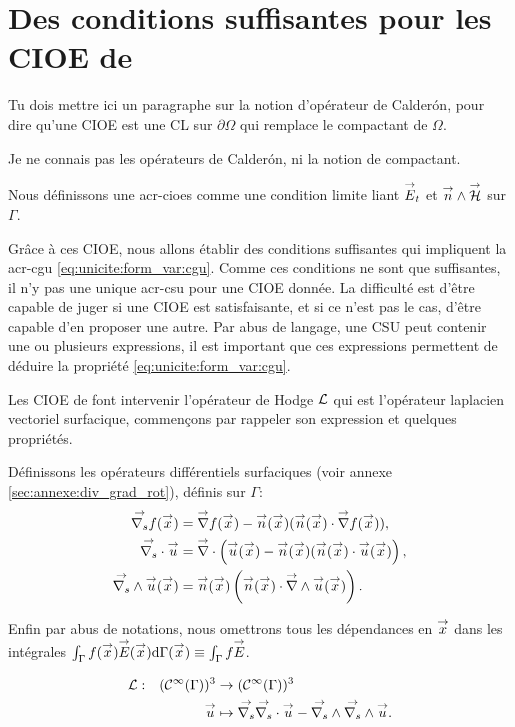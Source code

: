 \section[Des CSU pour les CIOE de Stupfel et Poget 2011]{Des conditions suffisantes pour les CIOE de \cite{stupfel_sufficient_2011}}

  \begin{REM}
    Tu dois mettre ici un paragraphe sur la notion d'opérateur de Calderón, pour dire qu'une CIOE est une CL sur \(\partial\Omega\) qui remplace le compactant de \(\Omega\).
  \end{REM}
  \begin{REP}
    Je ne connais pas les opérateurs de Calderón, ni la notion de compactant.
  \end{REP}
  Nous définissons une \glspl{acr-cioe} comme une condition limite liant \(\vE_t\) et \(\vn\pvect\vH\) sur \(\Gamma\).

  Grâce à ces CIOE, nous allons établir des conditions suffisantes qui impliquent la \gls{acr-cgu} \eqref{eq:unicite:form_var:cgu}. Comme ces conditions ne sont que suffisantes, il n'y pas une unique \gls{acr-csu} pour une CIOE donnée. La difficulté est d'être capable de juger si une CIOE est satisfaisante, et si ce n'est pas le cas, d'être capable d'en proposer une autre. Par abus de langage, une CSU peut contenir une ou plusieurs expressions, il est important que ces expressions permettent de déduire la propriété \eqref{eq:unicite:form_var:cgu}.

  Les CIOE de \cite{stupfel_sufficient_2011} font intervenir l'opérateur de Hodge \(\LL\) qui est l'opérateur laplacien vectoriel surfacique, commençons par rappeler son expression et quelques propriétés.

  Définissons les opérateurs différentiels surfaciques (voir annexe \ref{sec:annexe:div_grad_rot}), définis sur \(\Gamma\):
  \begin{align*}
      \vgrads{f}(\vx) &= \vgrad{f}(\vx) - \vn(\vx) (\vn(\vx) \cdot \vgrad{f}(\vx)),
      \\
      \vdivs{\vu} &= \vdiv\left(\vu(\vx) - \vn(\vx) (\vn(\vx) \cdot \vu(\vx)\right),
      \\
      \vrots{\vu}(\vx) &= \vn(\vx)\left(\vn(\vx) \cdot \vrot{\vu}(\vx)\right).
  \end{align*}


  Enfin par abus de notations, nous omettrons tous les dépendances en \(\vx\) dans les intégrales \(\int_\Gamma f(\vx)\vE(\vx)\dd{\Gamma(\vx)}\equiv \int_\Gamma f\vE\).
  \begin{defn}
    \label{def:operator:L}
    \begin{equation*}
        \fonction{\LL}{(\mathcal{C}^\infty(\Gamma))^3}{(\mathcal{C}^\infty(\Gamma))^3}
          {\vu}{\vgrads{\vdivs \vu} - \vrots{\vrots \vu}.}
    \end{equation*}
  \end{defn}

